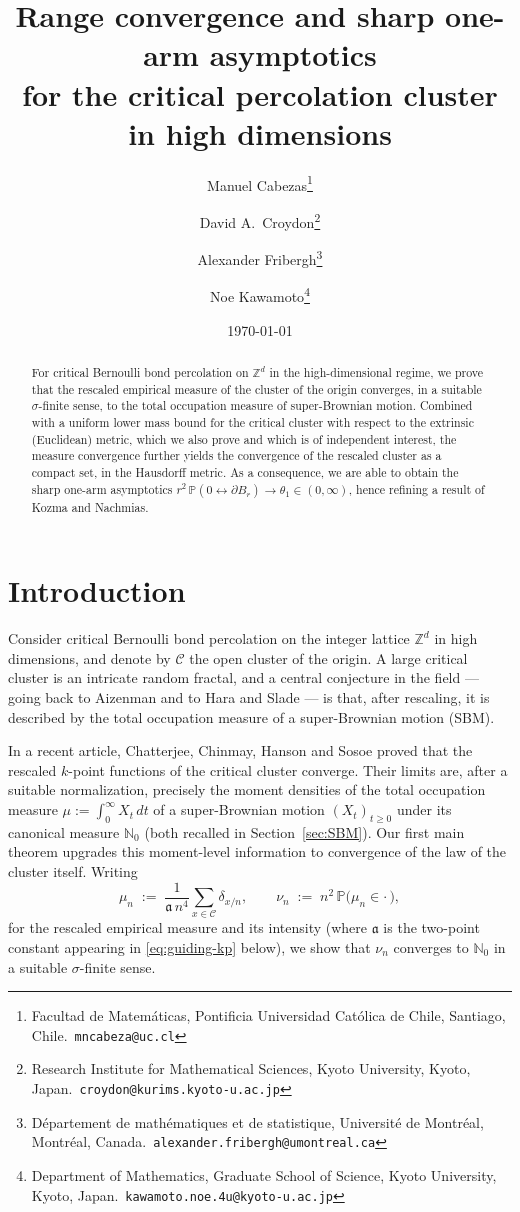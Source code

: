 \documentclass[11pt]{article}
\title{Range convergence and sharp one-arm asymptotics\\for the critical percolation cluster in high dimensions}
\author{%
  Manuel Cabezas\thanks{Facultad de Matem\'aticas, Pontificia Universidad Cat\'olica de Chile, Santiago, Chile.\ \texttt{mncabeza@uc.cl}}
  \and David A.\ Croydon\thanks{Research Institute for Mathematical Sciences, Kyoto University, Kyoto, Japan.\ \texttt{croydon@kurims.kyoto-u.ac.jp}}
  \and Alexander Fribergh\thanks{{D\'epartement de math\'ematiques et de statistique, Universit\'e de Montr\'eal, Montr\'eal, Canada}.\ \texttt{alexander.fribergh@umontreal.ca}}
  \and Noe Kawamoto\thanks{Department of Mathematics, Graduate School of Science, Kyoto University, Kyoto, Japan.\ \texttt{kawamoto.noe.4u@kyoto-u.ac.jp}}
}
\date{\today}
\theoremstyle{definition}
\theoremstyle{remark}
\newcommand{\R}{\mathbb{R}}
\newcommand{\Z}{\mathbb{Z}}
\newcommand{\bP}{\mathbb{P}}
\newcommand{\bN}{{\mathbb{N}_0}}                 %
\newcommand{\cM}{{\mathcal{M}_F(\R^d)}}          %
\newcommand{\cMM}{{\mathcal{M}_F(\mathcal{M}_F(\R^d))}}
\numberwithin{equation}{section}
\theoremstyle{plain}
\theoremstyle{definition}
\theoremstyle{remark}
\theoremstyle{plain}
\begin{document}
\maketitle

\begin{abstract}
For critical Bernoulli bond percolation on $\Z^d$ in the high-dimensional
regime, we prove that the rescaled empirical measure of the cluster of the
origin converges, in a suitable $\sigma$-finite sense, to the total occupation measure of super-Brownian motion. Combined with
a uniform lower mass bound for the critical cluster with respect to the extrinsic (Euclidean) metric, which we also prove and which is of independent interest, the measure
convergence further yields the convergence of the rescaled cluster as a compact set,
in the Hausdorff metric. As a consequence, we are able to obtain the sharp one-arm asymptotics
$r^2\,\bP(0\leftrightarrow \partial B_r)\to \theta_1\in(0,\infty)$, hence refining a result of Kozma and Nachmias.
\end{abstract}

\tableofcontents

\section{Introduction}

Consider critical Bernoulli bond percolation on the integer lattice $\Z^d$ in
high dimensions, and denote by $\mathcal C$ the open cluster of the origin. A large critical cluster is an intricate random fractal, and a central conjecture in the field --- going back to Aizenman \cite{Aiz97} and to Hara and Slade \cite{HS00a,HS00b} --- is that, after rescaling, it is described by the total occupation
measure of a super-Brownian motion (SBM).

In a recent article, Chatterjee, Chinmay, Hanson and Sosoe \cite{CCHS26}
proved that the rescaled $k$-point functions of the critical cluster converge.
Their limits are, after a suitable normalization, precisely the moment
densities of the total occupation measure
$\mu:=\int_0^\infty X_t\,dt$ of a super-Brownian motion $(X_t)_{t\geq 0}$ under
its canonical measure $\bN$ (both recalled in Section~\ref{sec:SBM}). Our first
main theorem upgrades this moment-level information to convergence of the law
of the cluster itself. Writing
\begin{equation}\label{eq:empirical}
\mu_n \;:=\; \frac{1}{\mathfrak a\, n^4}\sum_{x\in \mathcal C}\delta_{x/n},
\qquad
\nu_n \;:=\; n^2\,\bP\bigl(\mu_n\in\cdot\,\bigr),
\end{equation}
for the rescaled empirical measure and its intensity (where $\mathfrak a$ is the
two-point constant appearing in \eqref{eq:guiding-kp} below), we show that $\nu_n$ converges
to $\bN$ in a suitable $\sigma$-finite sense.
\end{document}
